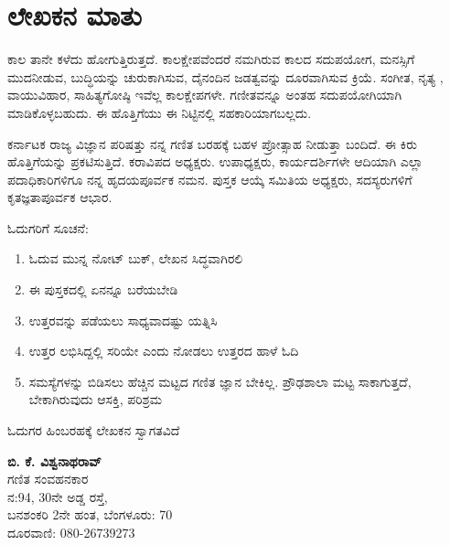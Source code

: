 \chapter*{ಲೇಖಕನ ಮಾತು}



\phantom{a}

\vskip  -1.2cm

\quad 
ಕಾಲ ತಾನೇ ಕಳೆದು ಹೋಗುತ್ತಿರುತ್ತದೆ. ಕಾಲಕ್ಷೇಪವೆಂದರೆ ನಮಗಿರುವ ಕಾಲದ ಸದುಪಯೋಗ, ಮನಸ್ಸಿಗೆ ಮುದನೀಡುವ, ಬುದ್ಧಿಯನ್ನು ಚುರುಕಾಗಿಸುವ, ದೈನಂದಿನ ಜಡತ್ವವನ್ನು ದೂರವಾಗಿಸುವ ಕ್ರಿಯೆ. ಸಂಗೀತ, ನೃತ್ಯ , ವಾಯುವಿಹಾರ, ಸಾಹಿತ್ಯಗೋಷ್ಠಿ ಇವೆಲ್ಲ ಕಾಲಕ್ಷೇಪಗಳೇ. ಗಣೀತವನ್ನೂ ಅಂತಹ ಸದುಪಯೋಗಿಯಾಗಿ ಮಾಡಿಕೊಳ್ಳಬಹುದು. ಈ ಹೊತ್ತಿಗೆಯು ಈ ನಿಟ್ಟಿನಲ್ಲಿ ಸಹಕಾರಿಯಾಗಬಲ್ಲದು. 

ಕರ್ನಾಟಕ ರಾಜ್ಯ ವಿಜ್ಞಾನ ಪರಿಷತ್ತು ನನ್ನ ಗಣಿತ ಬರಹಕ್ಕೆ ಬಹಳ ಪ್ರೋತ್ಸಾಹ ನೀಡುತ್ತಾ ಬಂದಿದೆ. ಈ ಕಿರು ಹೊತ್ತಿಗೆಯನ್ನು ಪ್ರಕಟಿಸುತ್ತಿದೆ. ಕರಾವಿಪದ ಅಧ್ಯಕ್ಷರು. ಉಪಾಧ್ಯಕ್ಷರು, ಕಾರ್ಯದರ್ಶಿಗಳೇ ಆದಿಯಾಗಿ ಎಲ್ಲಾ ಪದಾಧಿಕಾರಿಗಳಿಗೂ ನನ್ನ ಹೃದಯಪೂರ್ವಕ ನಮನ. ಪುಸ್ತಕ ಆಯ್ಕೆ ಸಮಿತಿಯ ಅಧ್ಯಕ್ಷರು, ಸದಸ್ಯರುಗಳಿಗೆ ಕೃತಜ್ಞತಾಪೂರ್ವಕ ಆಭಾರ. 

ಓದುಗರಿಗೆ ಸೂಚನೆ: 
\begin{enumerate}
\item ಓದುವ ಮುನ್ನ ನೋಟ್ ಬುಕ್, ಲೇಖನ ಸಿದ್ಧವಾಗಿರಲಿ 
\item ಈ ಪುಸ್ತಕದಲ್ಲಿ ಏನನ್ನೂ ಬರೆಯಬೇಡಿ 
\item ಉತ್ತರವನ್ನು ಪಡೆಯಲು ಸಾಧ್ಯವಾದಷ್ಟು ಯತ್ನಿಸಿ
\item ಉತ್ತರ ಲಭಿಸಿದ್ದಲ್ಲಿ ಸರಿಯೇ ಎಂದು ನೋಡಲು ಉತ್ತರದ ಹಾಳೆ ಓದಿ 
\item ಸಮಸ್ಯೆಗಳನ್ನು ಬಿಡಿಸಲು ಹೆಚ್ಚಿನ ಮಟ್ಟದ ಗಣಿತ ಜ್ಞಾನ ಬೇಕಿಲ್ಲ. ಪ್ರೌಢಶಾಲಾ ಮಟ್ಟ ಸಾಕಾಗುತ್ತದೆ, ಬೇಕಾಗಿರುವುದು ಆಸಕ್ತಿ, ಪರಿಶ್ರಮ 
\end{enumerate}
ಓದುಗರ ಹಿಂಬರಹಕ್ಕೆ ಲೇಖಕನ ಸ್ವಾಗತವಿದೆ 

\begin{flushright}
{\bf ಬಿ. ಕೆ. ವಿಶ್ವನಾಥರಾವ್}\\
ಗಣಿತ ಸಂವಹನಕಾರ\\
ನ:{\rm 94}, {\rm 30}ನೇ ಅಡ್ಡ ರಸ್ತೆ, \\
ಬನಶಂಕರಿ {\rm 2}ನೇ ಹಂತ, ಬೆಂಗಳೂರು: {\rm 70}\\
ದೂರವಾಣಿ: {\rm 080-26739273}
\end{flushright}






\newpage

